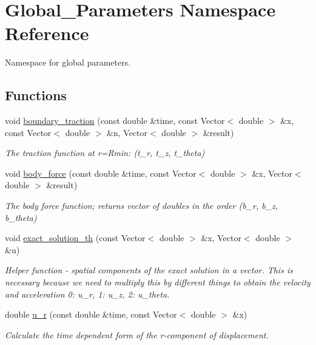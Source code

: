 \hypertarget{namespaceGlobal__Parameters}{}\section{Global\+\_\+\+Parameters Namespace Reference}
\label{namespaceGlobal__Parameters}


Namespace for global parameters.  


\subsection*{Functions}
\begin{DoxyCompactItemize}
\item 
void \hyperlink{namespaceGlobal__Parameters_a61ef31c4db13380658f6d5ea47c3369d}{boundary\+\_\+traction} (const double \&time, const Vector$<$ double $>$ \&x, const Vector$<$ double $>$ \&n, Vector$<$ double $>$ \&result)
\begin{DoxyCompactList}\small\item\em The traction function at r=Rmin\+: (t\+\_\+r, t\+\_\+z, t\+\_\+theta) \end{DoxyCompactList}\item 
void \hyperlink{namespaceGlobal__Parameters_a6459755c5d38e277ceddbf317c4ed179}{body\+\_\+force} (const double \&time, const Vector$<$ double $>$ \&x, Vector$<$ double $>$ \&result)
\begin{DoxyCompactList}\small\item\em The body force function; returns vector of doubles in the order (b\+\_\+r, b\+\_\+z, b\+\_\+theta) \end{DoxyCompactList}\item 
void \hyperlink{namespaceGlobal__Parameters_a42f4ce30b09a582bb2d85ddb6f087f80}{exact\+\_\+solution\+\_\+th} (const Vector$<$ double $>$ \&x, Vector$<$ double $>$ \&u)
\begin{DoxyCompactList}\small\item\em Helper function -\/ spatial components of the exact solution in a vector. This is necessary because we need to multiply this by different things to obtain the velocity and acceleration 0\+: u\+\_\+r, 1\+: u\+\_\+z, 2\+: u\+\_\+theta. \end{DoxyCompactList}\item 
double \hyperlink{namespaceGlobal__Parameters_ae600c7d1b0928a5cb532fa3a93bab338}{u\+\_\+r} (const double \&time, const Vector$<$ double $>$ \&x)
\begin{DoxyCompactList}\small\item\em Calculate the time dependent form of the r-\/component of displacement. \end{DoxyCompactList}\item 

\end{DoxyCompactItemize}
